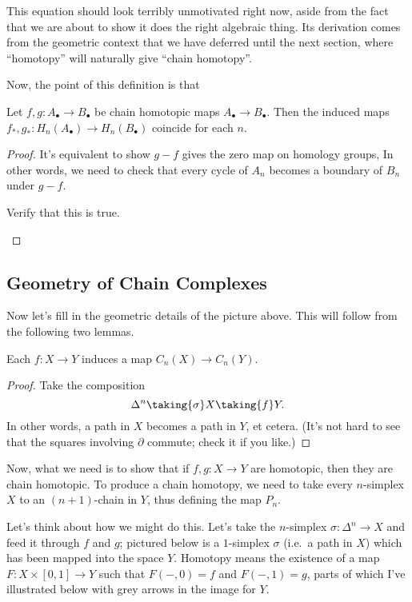 \begin{remark}
	This equation should look terribly unmotivated right now,
	aside from the fact that we are about to show it does the right algebraic thing.
	Its derivation comes from the geometric context that we have deferred
	until the next section, where ``homotopy'' will naturally give ``chain homotopy''.
\end{remark}

Now, the point of this definition is that
\begin{proposition}
	Let $f, g: A_\bullet \to B_\bullet$ be chain homotopic maps $A_\bullet \to B_\bullet$.
	Then the induced maps $f_\ast, g_\ast : H_n(A_\bullet) \to H_n(B_\bullet)$ coincide for each $n$.
\end{proposition}
\begin{proof}
	It's equivalent to show $g-f$ gives the zero map on homology groups,
	In other words, we need to check that every cycle of $A_n$ becomes
	a boundary of $B_n$ under $g-f$.
	\begin{ques}
		Verify that this is true. \qedhere
	\end{ques}
\end{proof}


\subsection*{Geometry of Chain Complexes}
Now let's fill in the geometric details of the picture above.
This will follow from the following two lemmas.
\begin{lemma}
	Each $f : X \to Y$ induces a map $C_n(X) \to C_n(Y)$.
\end{lemma}
\begin{proof}
	Take the composition
	\[ \Delta^n \taking{\sigma} X \taking{f} Y. \]
	In other words, a path in $X$ becomes a path in $Y$, et cetera.
	(It's not hard to see that the squares involving $\partial$ commute;
	check it if you like.)
\end{proof}

Now, what we need is to show that if $f , g : X \to Y$ are homotopic,
then they are chain homotopic.
To produce a chain homotopy, we need to take every $n$-simplex $X$
to an $(n+1)$-chain in $Y$, thus defining the map $P_n$.

Let's think about how we might do this. Let's take the $n$-simplex $\sigma : \Delta^n \to X$
and feed it through $f$ and $g$; pictured below is a $1$-simplex $\sigma$ (i.e.\ a path in $X$)
which has been mapped into the space $Y$.
Homotopy means the existence of a map $F : X \times [0,1] \to Y$
such that $F(-,0) = f$ and $F(-,1) = g$, parts of which I've illustrated below with grey arrows
in the image for $Y$.

